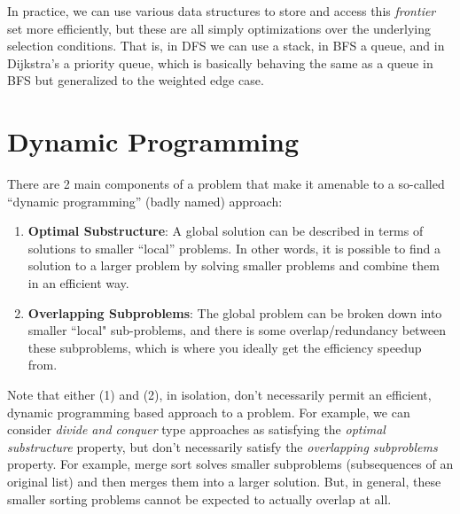 \documentclass[10pt,a4paper]{article}
\begin{document}
In practice, we can use various data structures to store and access this \textit{frontier} set more efficiently, but these are all simply optimizations over the underlying selection conditions. That is, in DFS we can use a stack, in BFS a queue, and in Dijkstra's a priority queue, which is basically behaving the same as a queue in BFS but generalized to the weighted edge case.


\section{Dynamic Programming}

There are 2 main components of a problem that make it amenable to a so-called ``dynamic programming'' (badly named) approach:
\begin{enumerate}
    \item \textbf{Optimal Substructure}: A global solution can be described in terms of solutions to smaller ``local'' problems. In other words, it is possible to find a solution to a larger problem by solving smaller problems and combine them in an efficient way. 
    \item \textbf{Overlapping Subproblems}: The global problem can be broken down into smaller ``local" sub-problems, and there is some overlap/redundancy between these subproblems, which is where you ideally get the efficiency speedup from.
\end{enumerate}
Note that either (1) and (2), in isolation, don't necessarily permit an efficient, dynamic programming based approach to a problem. For example, we can consider \textit{divide and conquer} type approaches as satisfying the \textit{optimal substructure} property, but don't necessarily satisfy the \textit{overlapping subproblems} property. For example, merge sort solves smaller subproblems (subsequences of an original list) and then merges them into a larger solution. But, in general, these smaller sorting problems cannot be expected to actually overlap at all.
\end{document}
